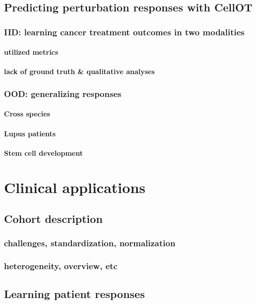 \section{Predicting perturbation responses with CellOT}
\subsection{IID: learning cancer treatment outcomes in two modalities}
\subsubsection{utilized metrics}
\subsubsection{lack of ground truth \& qualitative analyses}

\subsection{OOD: generalizing responses}
\subsubsection{Cross species}
\subsubsection{Lupus patients}
\subsubsection{Stem cell development}

\chapter{Clinical applications}
\section{Cohort description}
\subsection{challenges, standardization,  normalization}
\subsection{heterogeneity, overview, etc}

\section{Learning patient responses}

